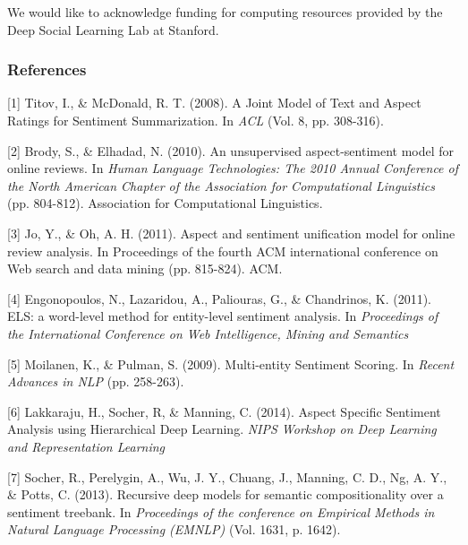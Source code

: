 \documentclass{article} %
\begin{document}
We would like to acknowledge funding for computing resources provided by the Deep Social Learning Lab at Stanford.

\subsubsection*{References} %

\small{

[1] Titov, I., \& McDonald, R. T. (2008). A Joint Model of Text and Aspect Ratings for Sentiment Summarization. In {\it ACL} (Vol. 8, pp. 308-316).

[2] Brody, S., \& Elhadad, N. (2010). An unsupervised aspect-sentiment model for online reviews. In {\it Human Language Technologies: The 2010 Annual Conference of the North American Chapter of the Association for Computational Linguistics} (pp. 804-812). Association for Computational Linguistics.

[3] Jo, Y., \& Oh, A. H. (2011). Aspect and sentiment unification model for online review analysis. In Proceedings of the fourth ACM international conference on Web search and data mining (pp. 815-824). ACM.


[4] Engonopoulos, N., Lazaridou, A., Paliouras, G., \& Chandrinos, K. (2011). ELS: a word-level method for entity-level sentiment analysis. In {\it Proceedings of the International Conference on Web Intelligence, Mining and Semantics}


[5] Moilanen, K., \& Pulman, S. (2009). Multi-entity Sentiment Scoring. In {\it Recent Advances in NLP} (pp. 258-263).


[6] Lakkaraju, H., Socher, R, \& Manning, C. (2014). Aspect Specific Sentiment Analysis using Hierarchical Deep Learning. {\it NIPS Workshop on Deep Learning and Representation Learning}

[7] Socher, R., Perelygin, A., Wu, J. Y., Chuang, J., Manning, C. D., Ng, A. Y., \& Potts, C. (2013). Recursive deep models for semantic compositionality over a sentiment treebank. In {\it Proceedings of the conference on Empirical Methods in Natural Language Processing (EMNLP)} (Vol. 1631, p. 1642).




}
\end{document}
